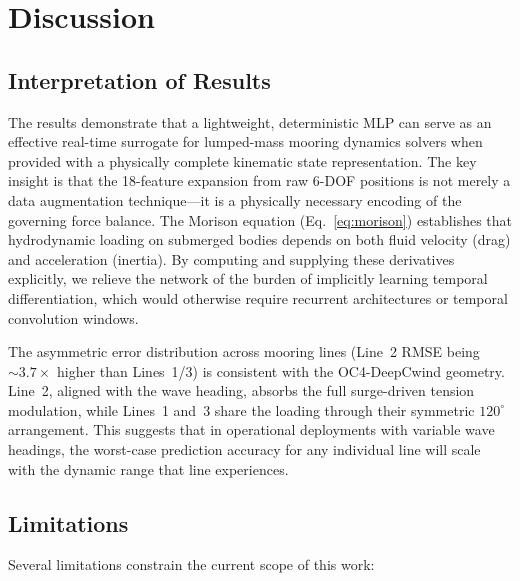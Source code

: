 \documentclass[preprint,12pt]{elsarticle}
\begin{document}
\section{Discussion}
\label{sec:discussion}

\subsection{Interpretation of Results}

The results demonstrate that a lightweight, deterministic MLP can serve as an effective real-time surrogate for lumped-mass mooring dynamics solvers when provided with a physically complete kinematic state representation. The key insight is that the 18-feature expansion from raw 6-DOF positions is not merely a data augmentation technique---it is a physically necessary encoding of the governing force balance. The Morison equation (Eq.~\ref{eq:morison}) establishes that hydrodynamic loading on submerged bodies depends on both fluid velocity (drag) and acceleration (inertia). By computing and supplying these derivatives explicitly, we relieve the network of the burden of implicitly learning temporal differentiation, which would otherwise require recurrent architectures or temporal convolution windows.

The asymmetric error distribution across mooring lines (Line~2 RMSE being ${\sim}3.7\times$ higher than Lines~1/3) is consistent with the OC4-DeepCwind geometry. Line~2, aligned with the wave heading, absorbs the full surge-driven tension modulation, while Lines~1 and~3 share the loading through their symmetric $120^\circ$ arrangement. This suggests that in operational deployments with variable wave headings, the worst-case prediction accuracy for any individual line will scale with the dynamic range that line experiences.

\subsection{Limitations}

Several limitations constrain the current scope of this work:
\end{document}
